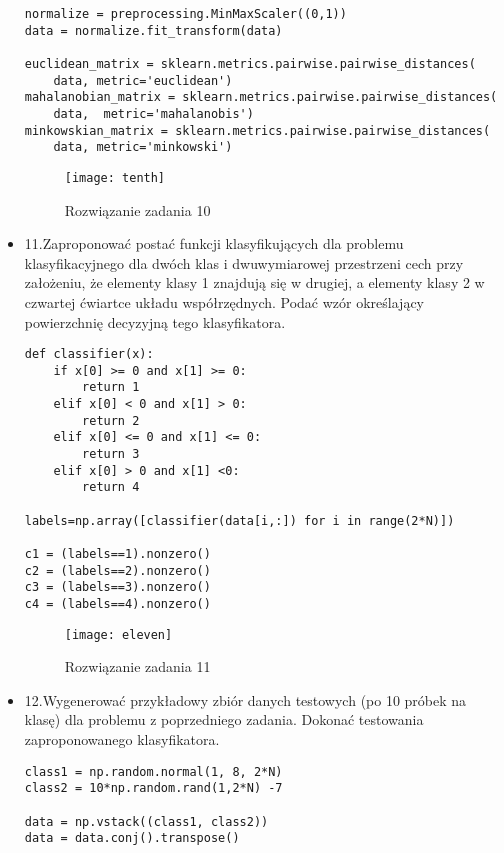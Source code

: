 \documentclass[12pt,a4paper]{article}
\begin{document}
\begin{itemize}
\begin{lstlisting}
normalize = preprocessing.MinMaxScaler((0,1))
data = normalize.fit_transform(data)

euclidean_matrix = sklearn.metrics.pairwise.pairwise_distances(
    data, metric='euclidean')
mahalanobian_matrix = sklearn.metrics.pairwise.pairwise_distances(
    data,  metric='mahalanobis')
minkowskian_matrix = sklearn.metrics.pairwise.pairwise_distances(
    data, metric='minkowski')

	\end{lstlisting}
		\begin{figure}[h]
                        \texttt{[image: tenth]}
                        \centering
			\caption{Rozwiązanie zadania 10}
			\label{fig:fig10}
                \end{figure}
                \clearpage
\item 11.Zaproponować postać funkcji klasyfikujących dla problemu klasyfikacyjnego dla dwóch klas i dwuwymiarowej przestrzeni cech przy założeniu, że elementy klasy 1 znajdują się w drugiej, a elementy klasy 2 w czwartej ćwiartce układu współrzędnych. Podać wzór określający powierzchnię decyzyjną tego klasyfikatora.
	\begin{lstlisting}
def classifier(x):
    if x[0] >= 0 and x[1] >= 0:
        return 1
    elif x[0] < 0 and x[1] > 0:
        return 2
    elif x[0] <= 0 and x[1] <= 0:
        return 3
    elif x[0] > 0 and x[1] <0:
        return 4

labels=np.array([classifier(data[i,:]) for i in range(2*N)])

c1 = (labels==1).nonzero()
c2 = (labels==2).nonzero()
c3 = (labels==3).nonzero()
c4 = (labels==4).nonzero()

	\end{lstlisting}
		\begin{figure}[h]
                        \texttt{[image: eleven]}
                        \centering
			\caption{Rozwiązanie zadania 11}
			\label{fig:fig11}
                \end{figure}
                \clearpage
\item 12.Wygenerować przykładowy zbiór danych testowych (po 10 próbek na klasę) dla problemu z poprzedniego zadania. Dokonać testowania zaproponowanego klasyfikatora.
	\begin{lstlisting}
class1 = np.random.normal(1, 8, 2*N)
class2 = 10*np.random.rand(1,2*N) -7

data = np.vstack((class1, class2))
data = data.conj().transpose()




\end{lstlisting}
\end{itemize}
\end{document}

